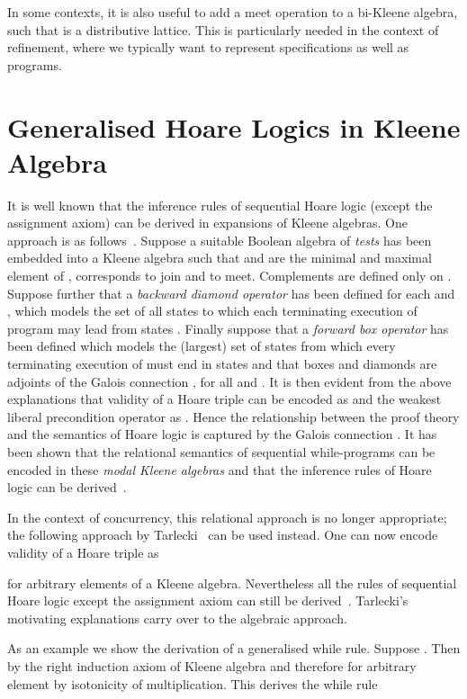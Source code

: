 \documentclass{llncs}
\begin{document}
In some contexts, it is also useful to add a meet operation  to a bi-Kleene algebra,
such that  is a distributive lattice. This is
particularly needed in the context of refinement, where we typically
want to represent specifications as well as programs.



\section{Generalised Hoare Logics  in Kleene Algebra}

It is well known that the inference rules of sequential Hoare logic
(except the assignment axiom) can be derived in expansions of Kleene
algebras. One approach is as
follows~\cite{moller_algebras_2006}. Suppose a suitable Boolean
algebra  of \emph{tests} has been embedded into a Kleene algebra
 such that  and  are the minimal and maximal element of ,
 corresponds to join and  to meet. Complements  are
defined only on . Suppose further that a \emph{backward diamond
  operator}  has been defined for each  and , which models the set of all states to which each terminating
execution of program  may lead from states . Finally suppose
that a \emph{forward box operator}  has been defined which
models the (largest) set of states from which every terminating
execution of  must end in states  and that boxes and diamonds
are adjoints of the Galois connection , for all  and . It is
then evident from the above explanations that validity of a Hoare
triple  can be encoded as  and
the weakest liberal precondition operator  as
. Hence the relationship between the proof theory and the
semantics of Hoare logic is captured by the Galois connection . It has
been shown that the relational semantics of sequential while-programs
can be encoded in these \emph{modal Kleene algebras} and that the
inference rules of Hoare logic can be
derived~\cite{moller_algebras_2006}.

In the context of concurrency, this relational approach is no longer
appropriate; the following approach by
Tarlecki~\cite{tarlecki_language_1985} can be used instead. One can
now encode validity of a Hoare triple as

for arbitrary elements of a Kleene algebra. Nevertheless all the
rules of sequential Hoare logic except the assignment axiom can still
be derived~\cite{hoare_concurrent_2011}. Tarlecki's motivating
explanations carry over to the algebraic approach.

As an example we show the derivation of a generalised while
rule. Suppose . Then  by the right induction axiom of Kleene algebra and therefore
 for arbitrary element  by
isotonicity of multiplication. This derives the while rule
\end{document}
